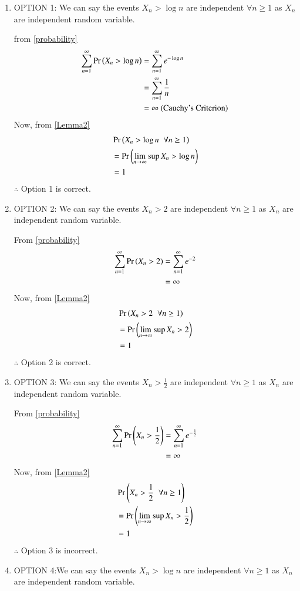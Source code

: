 \documentclass[journal,12pt,twocolumn]{IEEEtran}
\begin{document}
\begin{enumerate}
    \item OPTION 1: 
    We can say the events $X_n>\log n$ are independent $\forall n\geq 1$ as $X_n$ are independent random variable.
    
   from \eqref{probability}
    \begin{align}
        \sum_{n=1}^{\infty}\Pr\left(X_n > \log n\right) &=\sum_{n=1}^{\infty}e^{-\log n}\\ &=\sum_{n=1}^{\infty}\frac{1}{n}\\
        &= \infty\text{ (Cauchy's Criterion)}  
    \end{align}
    Now, from \eqref{Lemma2}
    \begin{align}
        &\Pr\left(X_n>\log n\hspace{0.2cm} \forall n\geq1\right)\\
        &=\Pr\left(\lim_{n \rightarrow \infty}\sup X_n>\log n\right)\\
        &=1
    \end{align}
    $\therefore$ Option 1 is correct. 
    
    \item OPTION 2: We can say the events $X_n>2$ are independent $\forall n\geq 1$ as $X_n$ are independent random variable.
    
    From \eqref{probability}
    \begin{align}
        \sum_{n=1}^{\infty}\Pr\left(X_n > 2\right) &= \sum_{n=1}^{\infty}e^{-2}\\
                                            &= \infty
    \end{align}
    Now, from \eqref{Lemma2}
    \begin{align}
        &\Pr\left(X_n>2 \hspace{0.2cm} \forall n\geq1\right)\\
        &=\Pr\left(\lim_{n \rightarrow \infty}\sup X_n>2\right)\\
        &=1
    \end{align}
    $\therefore$ Option 2 is correct.
    
    \item OPTION 3: We can say the events $X_n>\frac{1}{2}$ are independent $\forall n\geq 1$ as $X_n$ are independent random variable.
    
    From \eqref{probability}
    \begin{align}
        \sum_{n=1}^{\infty}\Pr\left(X_n > \frac{1}{2}\right) &= \sum_{n=1}^{\infty}e^{-\frac{1}{2}}\\
                                            &= \infty
    \end{align}
    Now, from \eqref{Lemma2}
    \begin{align}
        &\Pr\left(X_n>\frac{1}{2} \hspace{0.2cm} \forall n\geq1\right)\\
        &=\Pr\left(\lim_{n \rightarrow \infty}\sup X_n>\frac{1}{2}\right)\\
        &=1
    \end{align}
    $\therefore$ Option 3 is incorrect.
    \item OPTION 4:We can say the events $X_n>\log n$ are independent $\forall n\geq 1$ as $X_n$ are independent random variable.
    

\end{enumerate}
\end{document}
